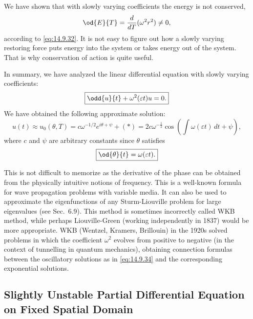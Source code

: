 We have shown that with slowly varying coefficients the energy is not conserved,
\[
\od{E}{T} = \frac{d}{d T}(\omega^2 r^2) \neq 0,
\]
according to \eqref{eq:14.9.32}. It is not easy to figure out how a slowly varying restoring force puts energy into the system or takes energy out of the system. That is why conservation of action is quite useful.

In summary, we have analyzed the linear differential equation with slowly varying coefficients:
\begin{equation}
\boxed{\odd{u}{t} + \omega^2(\varepsilon t)u = 0.}
\label{eq:14.9.33}
\end{equation}
We have obtained the following approximate solution:
\begin{equation}
\boxed{u(t) \approx u_0(\theta, T) = c\omega^{-1/2}e^{i\theta + \psi} + (*) = 2c\omega^{-\frac{1}{2}}\cos\left(\int\omega(\varepsilon t)\,dt + \psi\right),}
\label{eq:14.9.34}
\end{equation}
where $c$ and $\psi$ are arbitrary constants since $\theta$ satisfies
\begin{equation}
\boxed{\od{\theta}{t} = \omega(\varepsilon t).}
\label{eq:14.9.35}
\end{equation}

This is not difficult to memorize as the derivative of the phase can be obtained from the physically intuitive notions of frequency. This is a well-known formula for wave propagation problems with variable media. It can also be used to approximate the eigenfunctions of any Sturm-Liouville problem for large eigenvalues (see Sec.\ 6.9). This method is sometimes incorrectly called WKB method, while perhaps Liouville-Green (working independently in 1837) would be more appropriate. WKB (Wentzel, Kramers, Brillouin) in the 1920s solved problems in which the coefficient $\omega^2$ evolves from positive to negative (in the context of tunnelling in quantum mechanics), obtaining connection formulas between the oscillatory solutions as in \eqref{eq:14.9.34} and the corresponding exponential solutions.

\subsection{Slightly Unstable Partial Differential Equation on Fixed Spatial Domain}
\label{subsec:14.9.3}

